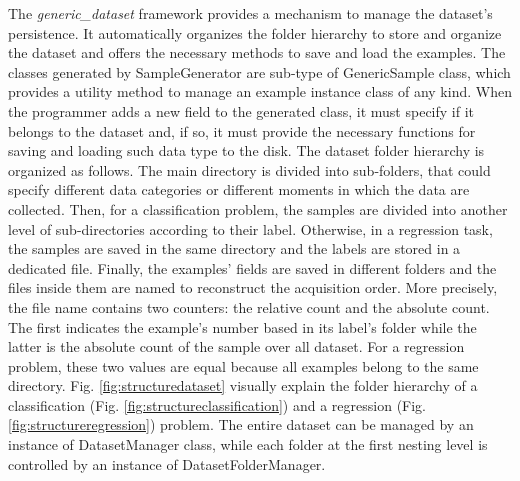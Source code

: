 The \textit{generic\_dataset} framework provides a mechanism to manage the dataset's persistence. It automatically organizes the folder hierarchy to store and organize the dataset and offers the necessary methods to save and load the examples. The classes generated by \textsf{SampleGenerator} are sub-type of \textsf{GenericSample} class, which provides a utility method to manage an example instance class of any kind. When the programmer adds a new field to the generated class, it must specify if it belongs to the dataset and, if so, it must provide the necessary functions for saving and loading such data type to the disk. The dataset folder hierarchy is organized as follows. The main directory is divided into sub-folders, that could specify different data categories or different moments in which the data are collected. Then, for a classification problem, the samples are divided into another level of sub-directories according to their label. Otherwise, in a regression task, the samples are saved in the same directory and the labels are stored in a dedicated file. Finally, the examples' fields are saved in different folders and the files inside them are named to reconstruct the acquisition order. More precisely, the file name contains two counters: the relative count and the absolute count. The first indicates the example's number based in its label's folder while the latter is the absolute count of the sample over all dataset. For a regression problem, these two values are equal because all examples belong to the same directory. Fig. \ref{fig:structuredataset} visually explain the folder hierarchy of a classification (Fig. \ref{fig:structureclassification}) and a regression (Fig. \ref{fig:structureregression}) problem. The entire dataset can be managed by an instance of \textsf{DatasetManager} class, while each folder at the first nesting level is controlled by an instance of \textsf{DatasetFolderManager}.

